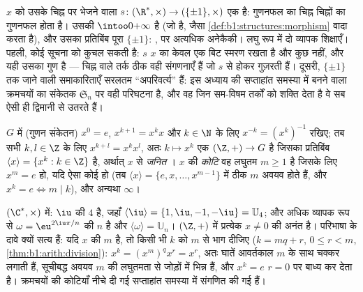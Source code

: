 \begin{example}[चिह्न समाकारिता]\label{ex:b1:structures:signmorphism}
$x$ को उसके चिह्न पर भेजने वाला  $s \colon (\R^*, \times) \to
(\{\pm1\}, \times)$ एक  है: गुणनफल का चिह्न चिह्नों का गुणनफल होता
है। उसकी  $\intoo0{+\infty}$ है (जो  है, जैसा
\cref{def:b1:structures:morphism} वादा करता है), और उसका प्रतिबिंब पूरा
$\{\pm1\}$: , पर अत्यधिक अनेकैकी। लघु रूप में दो व्यापक शिक्षाएँ।
पहली, कोई  सूचना को कुचल सकती है: $s$ $x$ का केवल एक बिट स्मरण रखता
है और कुछ नहीं, और यही उसका गुण है --- चिह्न वाले तर्क ठीक वही संगणनाएँ हैं
जो $s$ से होकर गुज़रती हैं। दूसरी, $\{\pm1\}$ तक जाने वाली समाकारिताएँ सरलतम
``अपरिवर्त्य'' हैं: इस अध्याय की सप्ताहांत समस्या में बनने वाला क्रमचयों का
संकेतक  $\mathfrak S_n$ पर वही परिघटना है, और वह जिन सम-विषम तर्कों को
शक्ति देता है वे सब ऐसी ही द्विमानी  से उतरते हैं।
\end{example}

\begin{definition}[घातें, अवयव की कोटि]\label{def:b1:structures:order}
 $G$ में (गुणन संकेतन) $x^0 = e$, $x^{k+1} = x^k x$ और $k \in \N$ के लिए
$x^{-k} = (x^k)^{-1}$ रखिए; तब सभी $k, l \in \Z$ के लिए $x^{k+l} = x^k x^l$,
अतः $k \mapsto x^k$ एक  $(\Z, +) \to G$ है जिसका प्रतिबिंब $\langle
x \rangle = \{x^k : k \in \Z\}$  है, अर्थात् $x$ से \emph{जनित}
। $x$ की \emph{कोटि} वह लघुतम $m \geq 1$ है जिसके
लिए $x^m = e$ हो, यदि ऐसा कोई हो (तब $\langle x\rangle = \{e, x, \dots,
x^{m-1}\}$ में ठीक $m$ अवयव होते हैं, और $x^k = e \iff m \mid k$), और अन्यथा
$\infty$।
\end{definition}

\begin{example}\label{ex:b1:structures:order}
$(\C^*, \times)$ में: $\iu$ की  $4$ है, जहाँ $\langle \iu \rangle = \{1,
\iu, -1, -\iu\} = \mathbb{U}_4$; और अधिक व्यापक रूप से $\omega =
\eu^{2\iu\pi/n}$ की  $n$ है और $\langle\omega\rangle = \mathbb{U}_n$।
$(\Z, +)$ में प्रत्येक $x \neq 0$ की  अनंत है। परिभाषा के दावे क्यों
सत्य हैं: यदि $x$ की  $m$ है, तो किसी भी $k$ को $m$ से भाग दीजिए ($k =
mq + r$, $0 \leq r < m$, \cref{thm:b1:arith:division}): $x^k = (x^m)^q x^r =
x^r$, अतः घातें आवर्तकाल $m$ के साथ चक्कर लगाती हैं, सूचीबद्ध अवयव $m$ की
लघुतमता से जोड़ों में भिन्न हैं, और $x^k = e$ $r = 0$ पर बाध्य कर देता है।
क्रमचयों की कोटियाँ नीचे दी गई सप्ताहांत समस्या में संगणित की गई हैं।
\end{example}

